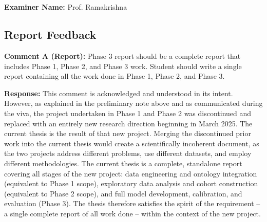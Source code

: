 \documentclass[12pt,a4paper]{article}
\begin{document}
\newpage

\section*{}

\begin{flushleft}
\large{\textbf{Examiner Name:}} Prof. Ramakrishna

\vspace{\baselineskip}


\subsection*{Report Feedback}

\vspace{\baselineskip}

\textbf{Comment A (Report):} Phase 3 report should be a complete report that includes Phase 1, Phase 2, and Phase 3 work. Student should write a single report containing all the work done in Phase 1, Phase 2, and Phase 3.

\vspace{\baselineskip}

\textbf{Response:} This comment is acknowledged and understood in its intent. However, as explained in the preliminary note above and as communicated during the viva, the project undertaken in Phase 1 and Phase 2 was discontinued and replaced with an entirely new research direction beginning in March 2025. The current thesis is the result of that new project. Merging the discontinued prior work into the current thesis would create a scientifically incoherent document, as the two projects address different problems, use different datasets, and employ different methodologies. The current thesis is a complete, standalone report covering all stages of the new project: data engineering and ontology integration (equivalent to Phase 1 scope), exploratory data analysis and cohort construction (equivalent to Phase 2 scope), and full model development, calibration, and evaluation (Phase 3). The thesis therefore satisfies the spirit of the requirement -- a single complete report of all work done -- within the context of the new project.

\vspace{\baselineskip}


\end{flushleft}
\end{document}
